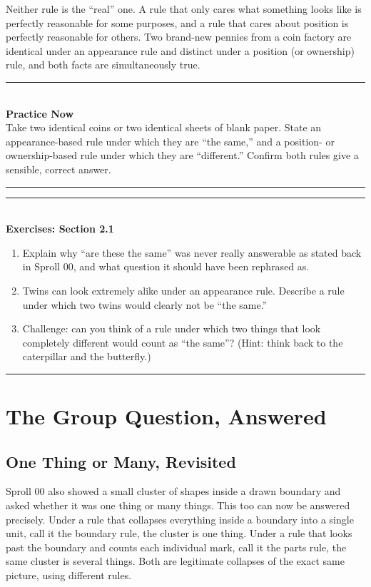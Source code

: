 \documentclass[11pt]{book}
\newenvironment{practicenow}{\vspace{0.6em}\noindent\rule{\linewidth}{0.6pt}\\[0.2em]\textbf{Practice Now}\\[0.3em]}{\\[0.2em]\noindent\rule{\linewidth}{0.6pt}\vspace{0.6em}}
\newenvironment{exercisebox}[1]{\vspace{0.8em}\noindent\rule{\linewidth}{0.6pt}\\[0.2em]\textbf{Exercises: #1}\\[0.3em]\begin{enumerate}[label=\arabic*., itemsep=0.4em]}{\end{enumerate}\noindent\rule{\linewidth}{0.6pt}\vspace{0.6em}}
\begin{document}
Neither rule is the ``real'' one. A rule that only cares what something looks like is perfectly reasonable for some purposes, and a rule that cares about position is perfectly reasonable for others. Two brand-new pennies from a coin factory are identical under an appearance rule and distinct under a position (or ownership) rule, and both facts are simultaneously true.

\begin{practicenow}
Take two identical coins or two identical sheets of blank paper. State an appearance-based rule under which they are ``the same,'' and a position- or ownership-based rule under which they are ``different.'' Confirm both rules give a sensible, correct answer.
\end{practicenow}

\begin{exercisebox}{Section 2.1}
\item Explain why ``are these the same'' was never really answerable as stated back in Sproll 00, and what question it should have been rephrased as.
\item Twins can look extremely alike under an appearance rule. Describe a rule under which two twins would clearly not be ``the same.''
\item Challenge: can you think of a rule under which two things that look completely different would count as ``the same''? (Hint: think back to the caterpillar and the butterfly.)
\end{exercisebox}

\chapter{The Group Question, Answered}

\section{One Thing or Many, Revisited}

Sproll 00 also showed a small cluster of shapes inside a drawn boundary and asked whether it was one thing or many things. This too can now be answered precisely. Under a rule that collapses everything inside a boundary into a single unit, call it the boundary rule, the cluster is one thing. Under a rule that looks past the boundary and counts each individual mark, call it the parts rule, the same cluster is several things. Both are legitimate collapses of the exact same picture, using different rules.
\end{document}

